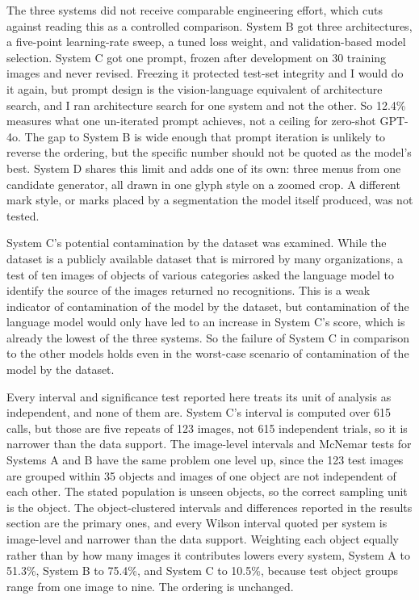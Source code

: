 \documentclass[12pt,letterpaper]{article}
\begin{document}
The three systems did not receive comparable engineering effort, which
cuts against reading this as a controlled comparison. System B got three
architectures, a five-point learning-rate sweep, a tuned loss weight,
and validation-based model selection. System C got one prompt, frozen
after development on 30 training images and never revised. Freezing it
protected test-set integrity and I would do it again, but prompt design
is the vision-language equivalent of architecture search, and I ran
architecture search for one system and not the other. So 12.4\%
measures what one un-iterated prompt achieves, not a ceiling for
zero-shot GPT-4o. The gap to System B is wide enough that prompt
iteration is unlikely to reverse the ordering, but the specific number
should not be quoted as the model's best. System D shares this limit
and adds one of its own: three menus from one candidate generator, all
drawn in one glyph style on a zoomed crop. A different mark style, or
marks placed by a segmentation the model itself produced, was not
tested.

System C's potential contamination by the dataset was examined. While
the dataset is a publicly available dataset that is mirrored by many
organizations, a test of ten images of objects of various categories
asked the language model to identify the source of the images returned
no recognitions. This is a weak indicator of contamination of the model
by the dataset, but contamination of the language model would only have
led to an increase in System C's score, which is already the lowest of
the three systems. So the failure of System C in comparison to the
other models holds even in the worst-case scenario of contamination of
the model by the dataset.

Every interval and significance test reported here treats its unit of
analysis as independent, and none of them are. System C's interval is
computed over 615 calls, but those are five repeats of 123 images, not
615 independent trials, so it is narrower than the data support. The
image-level intervals and McNemar tests for Systems A and B have the
same problem one level up, since the 123 test images are grouped within
35 objects and images of one object are not independent of each other.
The stated population is unseen objects, so the correct sampling unit
is the object. The object-clustered intervals and differences reported
in the results section are the primary ones, and every Wilson interval
quoted per system is image-level and narrower than the data support.
Weighting each object equally rather than by how many images it
contributes lowers every system, System A to 51.3\%, System B to
75.4\%, and System C to 10.5\%, because test object groups range from
one image to nine. The ordering is unchanged.
\end{document}

